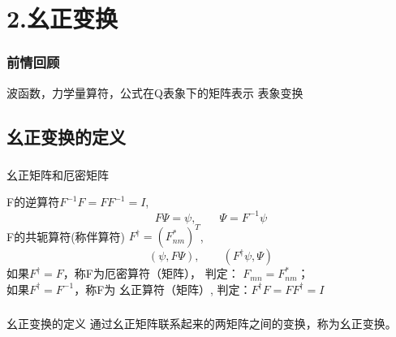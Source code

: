 \section{2.幺正变换}

\begin{frame}
    \frametitle{前情回顾}
    \begin{itemize}
       \done 波函数，力学量算符，公式在Q表象下的矩阵表示 
       \todo 表象变换
    \end{itemize}
\end{frame} 

\subsection{幺正变换的定义}

\begin{frame} 
    \frametitle{}
    \begin{tcolorbox1}{幺正矩阵和厄密矩阵}
        \begin{enumerate}
            \Item F的逆算符$F^{-1}F=FF^{-1}=I$, $$F\Psi=\psi, \qquad \Psi=F^{-1}\psi$$  
            \Item F的共轭算符(称伴算符) $F^{\dagger}=(F_{nm} ^*)^T$, $$ (\psi, F\Psi), \qquad (F^{\dagger}\psi, \Psi)$$
            如果$F^{\dagger } =F$，称F为{\color{red}厄密算符（矩阵）}， 
            判定： $F_{mn}=F_{nm} ^*$； 
            \\ 如果$ F^{\dagger }=F^{-1}$，称F为{\color{red} 幺正算符（矩阵）}, 判定：$F^{\dagger} F= FF^{\dagger}=I$
        \end{enumerate}       
    \end{tcolorbox1}
\end{frame}

\begin{frame} 
    \frametitle{}
    \begin{tcolorbox1}{幺正变换的定义}
    通过幺正矩阵联系起来的两矩阵之间的变换，称为幺正变换。
    \end{tcolorbox1}
\end{frame}

